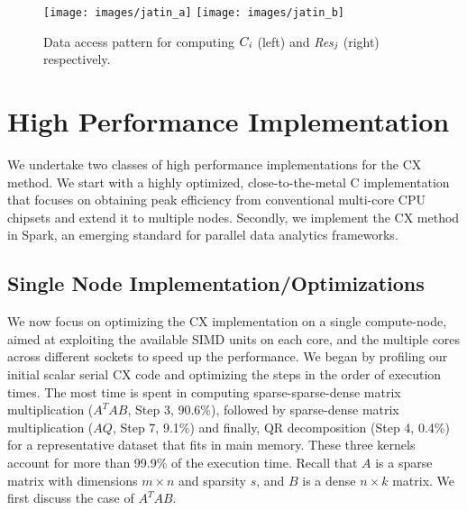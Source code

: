
\begin{figure*}[htp]
\texttt{[image: images/jatin\_a]}
\texttt{[image: images/jatin\_b]}
\caption{ Data access pattern for computing ${C}_{\it{i}}$ (left) and {\it{Res}}$_{\it{j}}$ (right) respectively.}
\label{fig:access_pattern}
\end{figure*}

\section{High Performance Implementation}
\label{sec:implementation}

We undertake two classes of high performance implementations for the CX method. 
We start with a highly optimized, close-to-the-metal C implementation
that focuses on obtaining peak efficiency from conventional multi-core
CPU chipsets and extend it to multiple nodes. 
Secondly, we implement the CX method in Spark, an emerging standard for parallel data analytics frameworks. 



\subsection {Single Node Implementation/Optimizations}
\label{sxn:single_node_opt}

    We now focus on optimizing the CX implementation on a single
    compute-node, aimed at exploiting the available SIMD units on each
    core, and the multiple cores across different sockets to speed up the performance. 
    We began by profiling our initial %
    scalar serial CX
    code and optimizing the steps in the order of execution times.
    The most time is spent in computing sparse-sparse-dense matrix
    multiplication ($A^TAB$, Step 3, 90.6\%), followed by  sparse-dense matrix
    multiplication ($AQ$, Step 7, 9.1\%) and finally, QR
    decomposition (Step 4, 0.4\%)
    for a representative dataset that fits in main memory. These
    three kernels account for more than 99.9\% of
    the execution time.
    Recall that $A$ is a sparse matrix with dimensions
    $m \times n$
    and sparsity $s$, and $B$ is a dense $n \times k$ matrix.
    We first discuss the case of $A^TAB$.

\vspace*{0.1in} 
